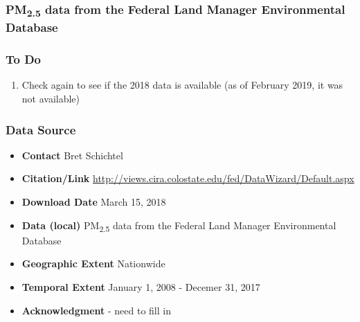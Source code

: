 \subsubsection{\texorpdfstring{PM\textsubscript{2.5}}{} data from the Federal Land Manager Environmental Database} \label{IMPROVE}

\subsubsection*{To Do}
\begin{enumerate}
\item Check again to see if the 2018 data is available (as of February 2019, it was not available)
\end{enumerate}

\subsubsection*{Data Source}

\begin{itemize}[nolistsep]
\item \textbf{Contact} Bret Schichtel
\item \textbf{Citation/Link} \url{http://views.cira.colostate.edu/fed/DataWizard/Default.aspx}
\item \textbf{Download Date} March 15, 2018%
\item \textbf{Data (local)} PM\textsubscript{2.5} data from the Federal Land Manager Environmental Database
\item \textbf{Geographic Extent} Nationwide
\item \textbf{Temporal Extent} January 1, 2008 - Decemer 31, 2017 %
\item \textbf{Acknowledgment} - need to fill in
\end{itemize}



